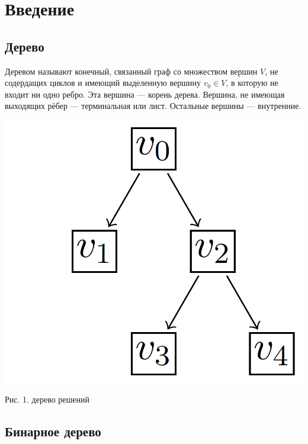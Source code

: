 \documentclass{article}
\begin{document}
\tableofcontents

\newpage

\section{Введение}

\subsection{Дерево}

Деревом называют конечный, связанный граф со множеством вершин $V$, не содердащих циклов и имеющий выделенную вершину $v_0 \in V$, в которую не входит ни одно ребро. Эта вершина --- корень дерева. Вершина, не имеющая выходящих рёбер --- терминальная или лист. Остальные вершины --- внутренние.
\begin{center}
	\includegraphics[scale=0.2]{pic1}
\end{center}
\begin{center}
	Рис. 1. дерево решений
\end{center}
\subsection{Бинарное дерево}
\end{document}
